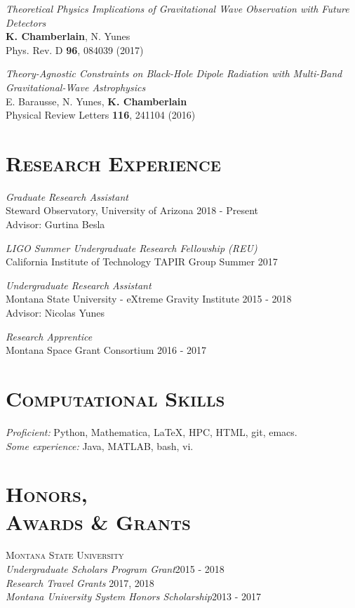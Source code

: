 \documentclass[margin]{res}
\begin{document}
\begin{resume}
\emph{Theoretical Physics Implications of Gravitational Wave Observation 
         with Future\\ Detectors}\\
\textbf{K. Chamberlain}, N. Yunes\\
Phys. Rev. D \textbf{96}, 084039 (2017)

\emph{Theory-Agnostic Constraints on Black-Hole Dipole Radiation with  
         Multi-Band Gravitational-Wave Astrophysics}\\
E. Barausse, N. Yunes,  \textbf{K. Chamberlain}  \\
Physical Review Letters \textbf{116}, 241104 (2016)
\smallskip


 
\section{\textsc{Research Experience}}
	{\sl Graduate Research Assistant} \\
	Steward Observatory, University of Arizona \hfill 2018 - Present\\
	Advisor: Gurtina Besla

	{\sl LIGO Summer Undergraduate Research Fellowship (REU)} \\
	California Institute of Technology TAPIR Group \hfill Summer 2017

	{\sl Undergraduate Research Assistant} \\
	Montana State University - eXtreme Gravity Institute \hfill 2015 - 2018\\
	Advisor: Nicolas Yunes
	
	{\sl Research Apprentice} \\
	Montana Space Grant Consortium \hfill 2016 - 2017

 \medskip
\section{\textsc{Computational Skills}}
\emph{Proficient:} Python, Mathematica, LaTeX, HPC, HTML, git, emacs. \\
\emph{Some experience:} Java, MATLAB, bash, vi. \\


	

\bigskip

\section{\textsc{Honors,\\ Awards \& Grants}}
{\textsc{Montana State University}}\\
{\sl Undergraduate Scholars Program Grant}\hfill	2015 - 2018\\
{\sl Research Travel Grants} \hfill	2017, 2018\\
{\sl Montana University System Honors Scholarship}\hfill		2013 - 2017


\end{resume}
\end{document}
